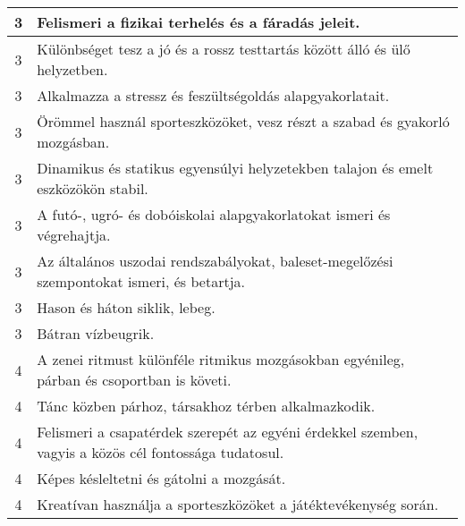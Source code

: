 \begin{longtable}{c | p{} }
                                
                                          3 &  Felismeri a fizikai terhelés és a fáradás jeleit. \\ \hline
                                          3 &  Különbséget tesz a jó és a rossz testtartás között álló és ülő helyzetben. \\ \hline
                                          3 &  Alkalmazza a stressz és feszültségoldás alapgyakorlatait. \\ \hline
                                          3 &  Örömmel használ sporteszközöket, vesz részt a szabad és gyakorló mozgásban. \\ \hline
                                          3 &  Dinamikus és statikus egyensúlyi helyzetekben talajon és emelt eszközökön stabil. \\ \hline
                                          3 &  A futó-, ugró- és dobóiskolai alapgyakorlatokat ismeri és végrehajtja. \\ \hline
                                          3 &  Az általános uszodai rendszabályokat, baleset-megelőzési szempontokat ismeri, és betartja. \\ \hline
                                          3 &  Hason és háton siklik, lebeg. \\ \hline
                                          3 &  Bátran vízbeugrik. \\ \hline
                                      
                                
                                          4 &  A zenei ritmust különféle ritmikus mozgásokban egyénileg, párban és csoportban is követi. \\ \hline
                                          4 &  Tánc közben párhoz, társakhoz térben alkalmazkodik. \\ \hline
                                          4 &  Felismeri a csapatérdek szerepét az egyéni érdekkel szemben, vagyis a közös cél fontossága tudatosul. \\ \hline
                                          4 &  Képes késleltetni és gátolni a mozgását. \\ \hline
                                          4 &  Kreatívan használja a sporteszközöket a játéktevékenység során. \\ \hline
                                      
                        \end{longtable}
            \clearpage

